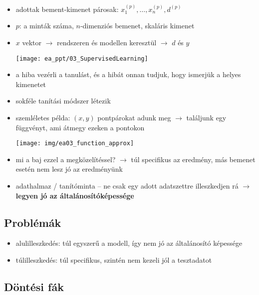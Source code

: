 \documentclass[a4paper, 11pt]{article}
\begin{document}
\begin{itemize}
	\item adottak bement-kimenet párosak: $x_1^{(p)}, \dots, x_n^{(p)}, d^{(p)}$
	\item $p$: a minták száma, $n$-dimenziós bemenet, skaláris kimenet
	\item $x$ vektor $\to$ rendszeren és modellen keresztül $\to$ $d$ és $y$ 
	\begin{center}
		\texttt{[image: ea\_ppt/03\_SupervisedLearning]}
	\end{center}
	\item a hiba vezérli a tanulást, és a hibát onnan tudjuk, hogy ismerjük a helyes kimenetet
	\item sokféle tanítási módszer létezik
	\item szemléletes példa: $(x,y)$ pontpárokat adunk meg $\to$ találjunk egy függvényt, ami átmegy ezeken a pontokon
	\begin{center}
		\texttt{[image: img/ea03\_function\_approx]}
	\end{center}
	\item mi a baj ezzel a megközelítéssel? $\to$ túl specifikus az eredmény, más bemenet esetén nem lesz jó az eredményünk
	\item adathalmaz / tanítóminta -- ne csak egy adott adatszettre illeszkedjen rá $\to$ \textbf{legyen jó az általánosítóképessége}
\end{itemize}

\subsection{Problémák}

\begin{itemize}
	\item alulilleszkedés: túl egyszerű a modell, így nem jó az általánosító képessége
	\item túlilleszkedés: túl specifikus, szintén nem kezeli jól a tesztadatot
\end{itemize}

\subsection{Döntési fák}
\end{document}
